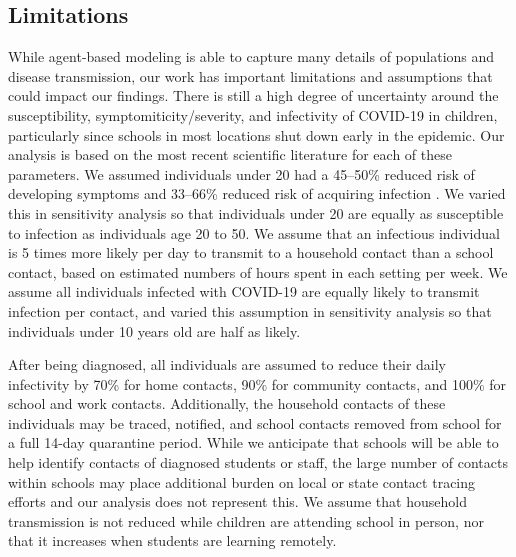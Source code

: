 \documentclass[9pt,twocolumn,twoside,lineno]{pnas-new}
\begin{document}
\subsection*{Limitations}

While agent-based modeling is able to capture many details of populations and disease transmission, our work has important limitations and assumptions that could impact our findings. There is still a high degree of uncertainty around the susceptibility, symptomiticity/severity, and infectivity of COVID-19 in children, particularly since schools in most locations shut down early in the epidemic. Our analysis is based on the most recent scientific literature for each of these parameters. We assumed individuals under 20 had a 45--50\% reduced risk of developing symptoms \cite{davies_age-dependent_nodate} and 33--66\% reduced risk of acquiring infection \cite{zhang_changes_2020}. We varied this in sensitivity analysis so that individuals under 20 are equally as susceptible to infection as individuals age 20 to 50. We assume that an infectious individual is 5 times more likely per day to transmit to a household contact than a school contact, based on estimated numbers of hours spent in each setting per week. We assume all individuals infected with COVID-19 are equally likely to transmit infection per contact, and varied this assumption in sensitivity analysis so that individuals under 10 years old are half as likely.

After being diagnosed, all individuals are assumed to reduce their daily infectivity by 70\% for home contacts, 90\% for community contacts, and 100\% for school and work contacts. Additionally, the household contacts of these individuals may be traced, notified, and school contacts removed from school for a full 14-day quarantine period. While we anticipate that schools will be able to help identify contacts of diagnosed students or staff, the large number of contacts within schools may place additional burden on local or state contact tracing efforts and our analysis does not represent this. We assume that household transmission is not reduced while children are attending school in person, nor that it increases when students are learning remotely.
\end{document}
